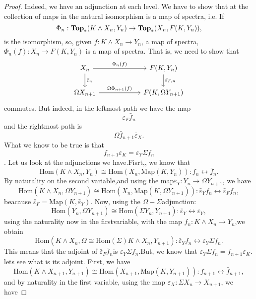 \documentclass[a4paper,english,11pt]{article}
\theoremstyle{definition}
\theoremstyle{plain}
\theoremstyle{remark}
\newcommand{\Top}{\textbf{\text{Top}}}
\newcommand{\Hom}{\text{Hom}}
\newcommand{\Map}{\text{Map}}
\newcommand{\struc}{\varepsilon}
\newcommand{\astruc}{\bar{\varepsilon}}
\begin{document}
\begin{proof}
  Indeed, we have an adjunction at each level. We have to show that at the collection of maps in the natural isomorphism is a map of spectra, i.e. If
  \[\Phi_n:\Top_\ast(K\wedge X_n,Y_n)\to \Top_\ast(X_n,F(K,Y_n)),\]
  is the isomorphism, so, given \(f:K\wedge X_n\to Y_n\), a map of spectra, \(\Phi_n(f):X_n\to F(K,Y_n)\) is a map of spectra. That is, we need to show that 
\begin{equation*}
    \begin{tikzcd}
      X_n\arrow{rr}{\Phi_n(f)}\arrow{d}{\astruc_n}&\ & F(K,Y_n)\arrow{d}{\astruc_{F,n}}\\
      \Omega X_{n+1}\arrow{rr}{\Omega\Phi_{n+1}(f)}&\ & F(K,\Omega Y_{n+1})
    \end{tikzcd}
\end{equation*}
commutes. But indeed, in the leftmost path we have the map
\[\astruc_F\bar{f}_{n}\]
and the rightmost path is
\[\Omega\bar{f}_{n+1}\astruc_X.\]
What we know to be true is that 
\[f_{n+1}\struc_K=\struc_Y\Sigma f_{n}\]. Let us look at the adjunctions we have.Fisrt,, we know that 
\[\Hom(K\wedge X_n, Y_n)\cong \Hom(X_n,\Map(K,Y_n)): f_n\leftrightarrow\bar{f}_n.\]
By naturality on the second variable,and using the map\(\astruc_Y:Y_n\to\Omega Y_{n+1}\), we have
\[\Hom(K\wedge X_n,\Omega Y_{n+1})\cong\Hom(X_n,\Map(K,\Omega Y_{n+1})):\astruc_Yf_n\leftrightarrow\astruc_F\bar{f}_n,\]
beacause \(\astruc_F=\Map(K,\astruc_Y)\). Now, using the \(\Omega-\Sigma\)adjunction:
\[\Hom(Y_n,\Omega Y_{n+1})\cong \Hom(\Sigma Y_n,Y_{n+1}):\astruc_Y\leftrightarrow \struc_Y,\]
using the naturality now in the firstvariable,  with the map \(f_n:K\wedge X_n\to Y_n\),we obtain
\[\Hom(K\wedge X_n,\Omega\cong \Hom(\Sigma) K\wedge X_n,Y_{n+1}): \astruc_Yf_n\leftrightarrow \struc_Y\Sigma f_n.\]
This means that the adjoint of \(\astruc_F\bar{f}_n\)is \(\struc_Y\Sigma f_n\).But, we know that \(\struc_Y\Sigma f_n=f_{n+1}\struc_K\). lets see what is its adjoint. First, we have
\[\Hom(K\wedge X_{n+1},Y_{n+1})\cong\Hom(X_{n+1},\Map(K,Y_{n+1})):f_{n+1}\leftrightarrow\bar{f}_{n+1},\]
and by naturality in the first variable, using the map \(\struc_X:\Sigma X_n\to X_{n+1}\), we have

\end{proof}
\end{document}
